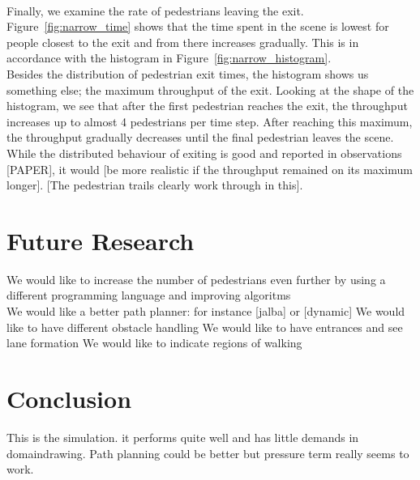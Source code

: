 \documentclass{article}
\begin{document}
\ \\
Finally, we examine the rate of pedestrians leaving the exit. Figure~\ref{fig:narrow_time} shows that the time spent in the scene is lowest for people closest to the exit and from there increases gradually. This is in accordance with the histogram in Figure~\ref{fig:narrow_histogram}. \\
Besides the distribution of pedestrian exit times, the histogram shows us something else; the maximum throughput of the exit. Looking at the shape of the histogram, we see that after the first pedestrian reaches the exit, the throughput increases up to almost 4 pedestrians per time step.
After reaching this maximum, the throughput gradually decreases until the final pedestrian leaves the scene. 
While the distributed behaviour of exiting is good and reported in observations [PAPER], it would [be more realistic if the throughput remained on its maximum longer]. [The pedestrian trails clearly work through in this].
\section{Future Research}
We would like to increase the number of pedestrians even further by using a different programming language and improving algoritms\\
We would like a better path planner: for instance [jalba] or [dynamic]
We would like to have different obstacle handling
We would like to have entrances and see lane formation
We would like to indicate regions of walking
\section{Conclusion}
This is the simulation. it performs quite well and has little demands in domaindrawing. Path planning could be better but pressure term really seems to work.

\newpage
 
\end{document}
